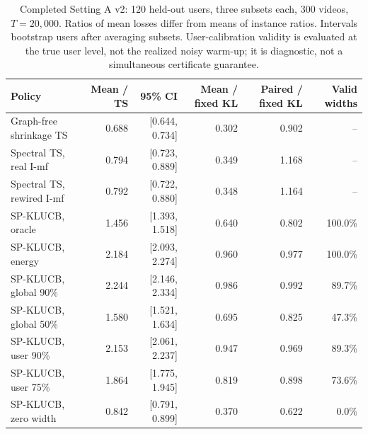 \begin{table}[!htbp]\centering\small
\begin{lrbox}{\latestTableBox}
\begin{tabular}{lrrrrr}
\toprule
Policy & Mean / TS & 95\% CI & Mean / fixed KL & Paired / fixed KL & Valid widths \\
\midrule
Graph-free shrinkage TS & 0.688 & [0.644, 0.734] & 0.302 & 0.902 & -- \\
Spectral TS, real I-mf & 0.794 & [0.723, 0.889] & 0.349 & 1.168 & -- \\
Spectral TS, rewired I-mf & 0.792 & [0.722, 0.880] & 0.348 & 1.164 & -- \\
SP-KLUCB, oracle & 1.456 & [1.393, 1.518] & 0.640 & 0.802 & 100.0\% \\
SP-KLUCB, energy & 2.184 & [2.093, 2.274] & 0.960 & 0.977 & 100.0\% \\
SP-KLUCB, global 90\% & 2.244 & [2.146, 2.334] & 0.986 & 0.992 & 89.7\% \\
SP-KLUCB, global 50\% & 1.580 & [1.521, 1.634] & 0.695 & 0.825 & 47.3\% \\
SP-KLUCB, user 90\% & 2.153 & [2.061, 2.237] & 0.947 & 0.969 & 89.3\% \\
SP-KLUCB, user 75\% & 1.864 & [1.775, 1.945] & 0.819 & 0.898 & 73.6\% \\
SP-KLUCB, zero width & 0.842 & [0.791, 0.899] & 0.370 & 0.622 & 0.0\% \\
\bottomrule
\end{tabular}\end{lrbox}
\ifdim\wd\latestTableBox>\linewidth\resizebox{\linewidth}{!}{\usebox{\latestTableBox}}\else\usebox{\latestTableBox}\fi
\caption{Completed Setting A v2: 120 held-out users, three subsets each, 300 videos, $T=20{,}000$. Ratios of mean losses differ from means of instance ratios. Intervals bootstrap users after averaging subsets. User-calibration validity is evaluated at the true user level, not the realized noisy warm-up; it is diagnostic, not a simultaneous certificate guarantee.}
\label{tab:latest-pooling}
\end{table}
